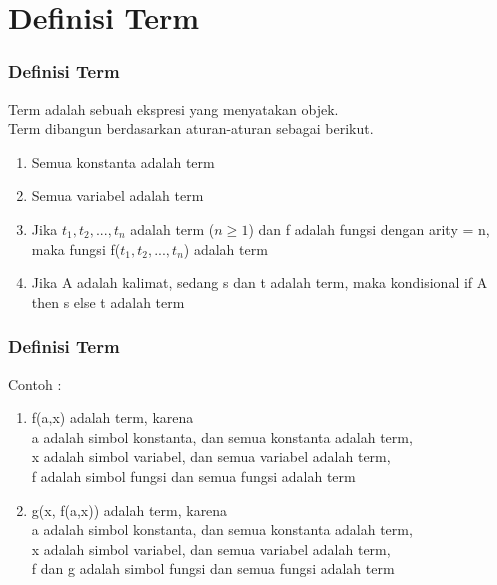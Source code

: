 \documentclass[handout]{beamer}
\theoremstyle{definition}
\theoremstyle{example}
\begin{document}
\section{Definisi Term}
\begin{frame}
	\frametitle{Definisi Term}
	Term adalah sebuah ekspresi yang menyatakan objek.\\
	Term dibangun berdasarkan aturan-aturan sebagai berikut.\\
	\begin{enumerate}
		\item Semua konstanta adalah term
		\item Semua variabel adalah term
		\item Jika $t_1, t_2, ..., t_n$ adalah term ($n \geq 1$) dan f adalah fungsi dengan arity = n,
	maka fungsi f($t_1,t_2, ..., t_n$) adalah term
		\item Jika A adalah kalimat, sedang s dan t adalah term, maka kondisional if A
	then s else t adalah term
    \end{enumerate}
\end{frame}	

\begin{frame}
	\frametitle{Definisi Term}
    Contoh :\\
    \begin{enumerate} 
    	\item  f(a,x) adalah term, karena\\
    a adalah simbol konstanta, dan semua konstanta adalah term,\\
    x adalah simbol variabel, dan semua variabel adalah term,\\
    f adalah simbol fungsi dan semua fungsi adalah term
    	\item  g(x, f(a,x)) adalah term, karena\\
    a adalah simbol konstanta, dan semua konstanta adalah term,\\
    x adalah simbol variabel, dan semua variabel adalah term,\\
    f dan g adalah simbol fungsi dan semua fungsi adalah term\\
    \end{enumerate}
\end{frame}	
\end{document}
